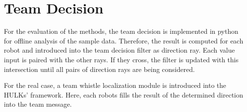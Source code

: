 \section{Team Decision}
\label{sec:03_teamDecision}

For the evaluation of the methods, the team decision is implemented in
python for offline analysis of the sample data.
Therefore, the result is computed for each robot and introduced into
the team decision filter as direction ray. %
Each value input is paired with the other rays. If they cross, the
filter is updated with this intersection until all pairs of direction
rays are being considered.

For the real case, a team whistle localization module is
introduced into the HULKs' framework.
Here, each robots fills the result of the determined direction into
the team message.

